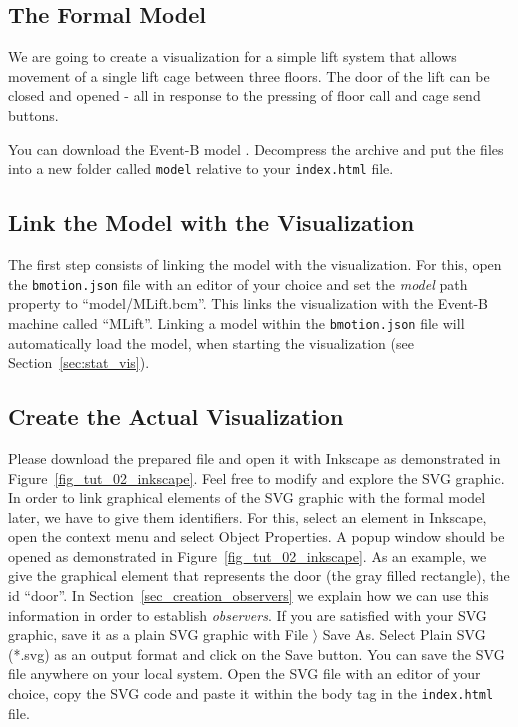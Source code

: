 \subsection{The Formal Model}

We are going to create a visualization	for a simple lift system that allows movement of a single lift cage between three floors.
The door of the lift can be closed and opened - all in response to the pressing of floor call and cage send buttons.

You can download the Event-B model .
Decompress the archive and put the files into a new folder called \texttt{model} relative to your \texttt{index.html} file.

\subsection{Link the Model with the Visualization}

The first step consists of linking the model with the visualization.
For this, open the \texttt{bmotion.json} file with an editor of your choice and set the \textit{model} path property to ``model/MLift.bcm''.
This links the visualization with the Event-B machine called ``MLift''.
Linking a model within the \texttt{bmotion.json} file will automatically load the model, when starting the visualization (see Section~\ref{sec:stat_vis}).

\subsection{Create the Actual Visualization}

Please download the prepared  file and open it with Inkscape as demonstrated in Figure~\ref{fig_tut_02_inkscape}.
Feel free to modify and explore the SVG graphic.
In order to link graphical elements of the SVG graphic with the formal model later, we have to give them identifiers. 
For this, select an element in Inkscape, open the context menu and select \textsf{Object Properties}.
A popup window should be opened as demonstrated in Figure~\ref{fig_tut_02_inkscape}.
As an example, we give the graphical element that represents the door (the gray filled rectangle), the id ``door''.
In Section~\ref{sec_creation_observers} we explain how we can use this information in order to establish \textit{observers}.
If you are satisfied with your SVG graphic, save it as a plain SVG graphic with \textsf{File $\rangle$ Save As}.
Select \textsf{Plain SVG (*.svg)} as an output format and click on the \textsf{Save} button.
You can save the SVG file anywhere on your local system. 
Open the SVG file with an editor of your choice, copy the SVG code and paste it within the body tag in the \texttt{index.html} file.

